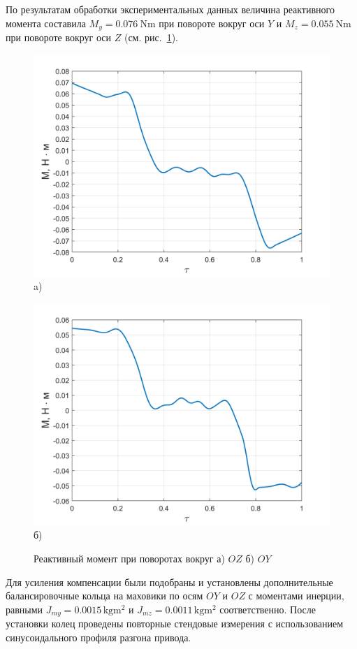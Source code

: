 По результатам обработки экспериментальных данных величина реактивного момента составила $M_y = \SI{0,076}{\newton\meter}$ при повороте вокруг оси $Y$ и $M_z = \SI{0,055}{\newton\meter}$ при повороте вокруг оси $Z$ (см. рис.~\cref{fig:omn-mom}).

\begin{figure}[!h]
	\begin{minipage}[b]{0.49\linewidth}\centering
		\includegraphics[width=0.8\linewidth]{matlab/img/oy-gyro-mom.png}\\[-2pt] a)
	\end{minipage}
	\hfill
	\begin{minipage}[b]{0.49\linewidth}\centering
		\includegraphics[width=0.8\linewidth]{matlab/img/oz-gyro-mom.png}\\[-2pt] б)
	\end{minipage}
	\caption{Реактивный момент при поворотах вокруг а) $OZ$ б) $OY$}
	\label{fig:omn-mom}
\end{figure}

Для усиления компенсации были подобраны и установлены дополнительные балансировочные кольца на маховики  по осям $OY$ и $OZ$ с моментами инерции, равными $J_{my}=\num{0.0015}\,\si{\kilo\gram\meter\squared}$ и $J_{mz}=\num{0.0011}\,\si{\kilo\gram\meter\squared}$ соответственно. После установки колец проведены повторные стендовые измерения с использованием синусоидального профиля разгона привода.


